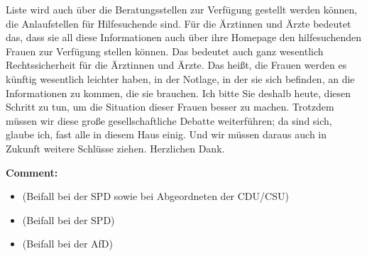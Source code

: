 \documentclass{article}
\begin{document}
Liste wird auch über die Beratungsstellen zur Verfügung gestellt werden können, die Anlaufstellen für Hilfesuchende sind.  Für die Ärztinnen und Ärzte bedeutet das, dass sie all diese Informationen auch über ihre Homepage den hilfesuchenden Frauen zur Verfügung stellen können. Das bedeutet auch ganz wesentlich Rechtssicherheit für die Ärztinnen und Ärzte.  Das heißt, die Frauen werden es künftig wesentlich leichter haben, in der Notlage, in der sie sich befinden, an die Informationen zu kommen, die sie brauchen. Ich bitte Sie deshalb heute, diesen Schritt zu tun, um die Situation dieser Frauen besser zu machen. Trotzdem müssen wir diese große gesellschaftliche Debatte weiterführen; da sind sich, glaube ich, fast alle in diesem Haus einig. Und wir müssen daraus auch in Zukunft weitere Schlüsse ziehen. Herzlichen Dank.  

\noindent\textbf{Comment:}
\begin{itemize}
    \setlength\itemsep{-3pt}
    \item (Beifall bei der SPD sowie bei Abgeordneten der CDU/CSU)
    \setlength\itemsep{-3pt}
    \item (Beifall bei der SPD)
    \setlength\itemsep{-3pt}
    \item (Beifall bei der AfD)
\end{itemize}
\end{document}
